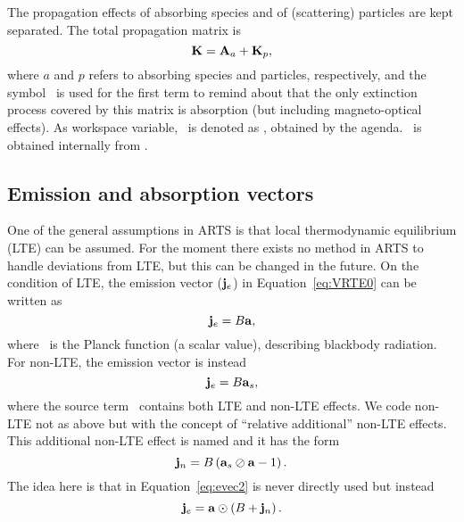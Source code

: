 The propagation effects of absorbing species and of (scattering) particles are
kept separated.
The total propagation matrix is 
\begin{equation}
  \label{eq:propmattotal}
  {\bf K} = {\bf A}_{a} + {\bf K}_{p}, 
\end{equation}
where $a$ and $p$ refers to absorbing species and particles, respectively, and
the symbol \AbsMat\ is used for the first term to remind about that the only
extinction process covered by this matrix is absorption (but including
magneto-optical effects). As workspace variable, \ is denoted as
, obtained by the
 agenda. \ is obtained
internally from .



\subsection{Emission and absorption vectors}
\label{sec:rteq:evec}

One of the general assumptions in ARTS is that local thermodynamic equilibrium
(LTE) can be assumed. For the moment there exists no method in ARTS to handle
deviations from LTE, but this can be changed in the future.
On the condition of LTE, the emission vector ($\mathbf{j}_e$) in
Equation~\ref{eq:VRTE0} can be written as
\begin{equation}
  \label{eq:evec1}
  {\bf j}_{e} = B {\bf a},
\end{equation}
where \Planck\ is the Planck function (a scalar value), describing blackbody
radiation. For non-LTE, the emission vector
is instead
\begin{equation}
  \label{eq:evec_withnlte1}
  {\bf j}_{e} = B{\bf a}_{s},
\end{equation}
where the source term \ contains both LTE and non-LTE effects.
We code non-LTE not as above but with the concept of ``relative additional'' non-LTE effects.  
This additional non-LTE effect is named  and it has the form
\begin{equation}
  \label{eq:nlte_source}
  {\bf j}_{n} = B\left({\bf a}_{s}\oslash{\bf a}-1\right).
\end{equation}
The idea here is that  in Equation~\ref{eq:evec2} is never directly used
but instead
\begin{equation}
  \label{eq:evec_withnlte2}
  {\bf j}_{e} = {\bf a}\odot\left(B + {\bf j}_{n}\right).
\end{equation}

